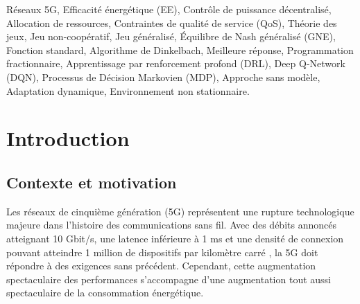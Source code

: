 \documentclass[conference]{IEEEtran}
\begin{document}
\begin{abstract}
Les expériences menées dans un environnement de simulation réaliste montrent que notre agent DQN atteint une EE moyenne de 515 000 bit/J, soit un gain de plus de 130 \% par rapport aux algorithmes distribués classiques, tout en maintenant un taux de violation de la QoS inférieur à 0,03 \%. De plus, l'approche DQN s'adapte dynamiquement aux variations des conditions radio et améliore ses performances avec l'expérience, contrairement aux méthodes analytiques. Nous visualisons également la topologie du réseau et la convergence des décisions à l'aide de la base de données graphe Neo4j, confirmant la stabilité et la cohérence de la politique apprise. Ces résultats démontrent la pertinence et l'efficacité de l'apprentissage par renforcement profond pour le contrôle de puissance dans les réseaux 5G, ouvrant la voie à des systèmes autonomes, adaptatifs et économes en énergie.
\end{abstract}

\begin{IEEEkeywords}
Réseaux 5G, Efficacité énergétique (EE), Contrôle de puissance décentralisé, Allocation de ressources, Contraintes de qualité de service (QoS), Théorie des jeux, Jeu non-coopératif, Jeu généralisé, Équilibre de Nash généralisé (GNE), Fonction standard, Algorithme de Dinkelbach, Meilleure réponse, Programmation fractionnaire, Apprentissage par renforcement profond (DRL), Deep Q-Network (DQN), Processus de Décision Markovien (MDP), Approche sans modèle, Adaptation dynamique, Environnement non stationnaire.
\end{IEEEkeywords}

\section{Introduction}

\subsection{Contexte et motivation}

Les réseaux de cinquième génération (5G) représentent une rupture technologique majeure dans l'histoire des communications sans fil. Avec des débits annoncés atteignant 10 Gbit/s, une latence inférieure à 1 ms et une densité de connexion pouvant atteindre 1 million de dispositifs par kilomètre carré \cite{3GPP}, la 5G doit répondre à des exigences sans précédent. Cependant, cette augmentation spectaculaire des performances s'accompagne d'une augmentation tout aussi spectaculaire de la consommation énergétique.
\end{document}
